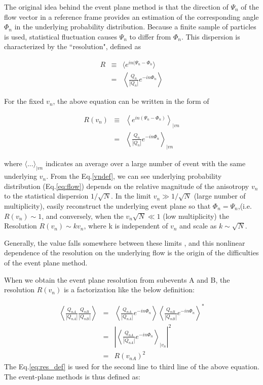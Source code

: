 	The original idea behind the event plane method is that the direction of $\Psi_n$ of the flow vector in a reference frame provides an estimation of the corresponding angle $\Phi_n$ in the underlying probability distribution. Because a finite sample of particles is used, statistical fluctuation causes $\Psi_n$ to differ from $\Phi_n$. This dispersion is characterized by the ``resolution", defined as
	
	\begin{eqnarray}
		R &\equiv & \langle e^{in(\Psi_n - \Phi_n} \rangle  \\
			&=& \left\langle \frac{Q_n}{|Q_n|} e^{-in\Phi_n} \right\rangle 
	\end{eqnarray}

	For the fixed $v_n$, the above equation can be written in the form of
	
	\begin{eqnarray}
		R(v_n) &\equiv &  \left\langle e^{in(\Psi_n - \Phi_n)} \right\rangle _{|vn} \\ 
		&=& \left\langle \frac{Q_n}{|Q_n|} e^{-in\Phi_n} \right\rangle _{|vn} \label{eq:res_def}
	\end{eqnarray}
	
	where $\langle ... \rangle _{|vn}$ indicates an average over a large number of event with the same underlying $v_n$. From the Eq.\ref{vndef}, we can see underlying probability distribution (Eq.\ref{eq:flow}) depends on the relative magnitude of the anisotropy $v_n$ to the statistical dispersion $1/\sqrt{N}$. In the limit $v_n \gg 1/\sqrt{N}$ (large number of multiplicity), easily reconstruct the underlying event plane so that $\Phi_n = \Psi_n$,(i.e. $R(v_n) \sim 1$, and conversely, when the $v_n \sqrt{N} \ll 1$ (low multiplicity) the Resolution $R(v_n) \sim kv_n$, where k is independent of $v_n$ and scale as $k \sim \sqrt{N}$. 
	
	Generally, the value falls somewhere between these limits \cite{Luzum:2013yya}, and this nonlinear dependence of the resolution on the underlying flow is the origin of the difficulties of the event plane method.
	
	When we obtain the event plane resolution from subevents A and B, the resolution $R(v_n)$ is a factorization like the below  definition:
	
	\begin{eqnarray}
		\left \langle \frac{Q_{nA}}{|Q_{nA}|}  \frac{Q_{nB}}{|Q_{nB}|} \right \rangle &=&  \left \langle \frac{Q_{nA}}{|Q_{nA}|} e^{-in\Phi_n} \right \rangle \left \langle \frac{Q_{nB}}{|Q_{nB}|} e^{-in\Phi_n} \right \rangle^{*} \\
		&=& \left |   \left \langle   \frac{Q_{nA}}{|Q_{nA}|} e^{-in\Phi_n}  \right \rangle _{|v_n} \right | ^{2} \\ 
		&=&  R(v_{nA})^2
	\end{eqnarray}
	The Eq.\ref{eq:res_def} is used for the second line to third line of the above equation. The event-plane methods is thus defined as:
	
